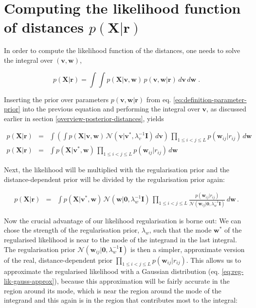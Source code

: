 \documentclass[12pt,a4paper,twoside]{book}
\newcommand{\Gauss}{\mathcal{N}}
\newcommand{\I}{\mathbf{I}}
\renewcommand{\r}{\mathbf{r}}
\newcommand{\rij}{r_{ij}}
\renewcommand{\v}{\mathbf{v}}
\newcommand{\w}{\mathbf{w}}
\newcommand{\wij}{\mathbf{w}_{ij}}
\newcommand{\X}{\mathbf{X}}
\theoremstyle{definition}
\theoremstyle{definition}
\theoremstyle{remark}
\begin{document}
\section{\texorpdfstring{Computing the likelihood function of distances
\(p(\X | \r)\)}{Computing the likelihood function of distances p(\textbackslash{}X \textbar{} \textbackslash{}r)}}\label{likelihood-fct-distances}

In order to compute the likelihood function of the distances, one needs
to solve the integral over \((\v, \w)\),

\begin{equation}
    p(\X | \r) = \int \int p(\X | \v,\w) \, p(\v, \w | \r) \,d\v\,d\w \; .
\label{eq:likelihood-distances}
\end{equation}

Inserting the prior over parameters \(p(\v, \w | \r)\) from eq.
\eqref{eq:definition-parameter-prior} into the previous equation and
performing the integral over \(\v\), as discussed earlier in section
\ref{overview-posterior-distances}, yields

\begin{eqnarray}
    p(\X | \r) &=& \int \left( \int  p(\X | \v,\w) \, \Gauss(\v|\v^*,\lambda_v^{-1} \I) \,d\v \right) \, \prod_{1\le i<j\le L} p(\wij|\rij) \, d\w  \\
    p(\X | \r) &=& \int  p(\X | \v^*,\w) \, \prod_{1\le i<j\le L} p(\wij|\rij) \, d\w  
\label{eq:in_over_w_1}
\end{eqnarray}

Next, the likelihood will be multiplied with the regularisation prior
and the distance-dependent prior will be divided by the regularisation
prior again:

\begin{eqnarray}
      p(\X | \r) &=& \int p(\X | \v^*,\w) \, \Gauss(\w|\mathbf{0}, \lambda_w^{-1} \I) \, \prod_{1\le i<j\le L} \frac{p(\wij|\rij)}{\Gauss(\wij|\mathbf{0}, \lambda_w^{-1} \I)} \,d\w \, .
\end{eqnarray}

Now the crucial advantage of our likelihood regularisation is borne out:
We can chose the strength of the regularisation prior, \(\lambda_w\),
such that the mode \(\w^*\) of the regularised likelihood is near to the
mode of the integrand in the last integral. The regularisation prior
\(\Gauss(\wij|\mathbf{0}, \lambda_w^{-1} \I)\) is then a simpler,
approximate version of the real, distance-dependent prior
\(\prod_{1\le i<j\le L} p(\wij|\rij)\). This allows us to approximate
the regularised likelihood with a Gaussian distribution (eq.
\eqref{eq:reg-lik-gauss-approx}), because this approximation will be
fairly accurate in the region around its mode, which is near the region
around the mode of the integrand and this again is in the region that
contributes most to the integral:
\end{document}
